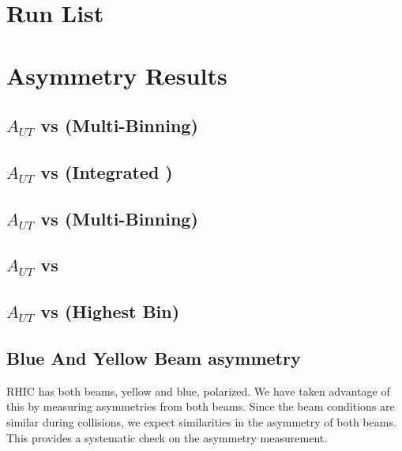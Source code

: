 \section{Run List}
\label{appsec:runlist2015}

%
%

\section{Asymmetry Results}

\subsection{$A_{UT}$ vs \minv (Multi-Binning)}


\subsection{$A_{UT}$ vs \minv (Integrated \ptp)}


\subsection{$A_{UT}$ vs \ptp (Multi-Binning)}


\subsection{$A_{UT}$ vs \etap }


\subsection{$A_{UT}$ vs \minv (Highest \ptp Bin) }


\subsection{Blue And Yellow Beam asymmetry}

RHIC has both beams, yellow and blue, polarized. We have taken advantage of this by measuring asymmetries from both beams. Since the beam conditions are similar during collisions, we expect similarities in the asymmetry of both beams. This provides a systematic check on the asymmetry measurement.

